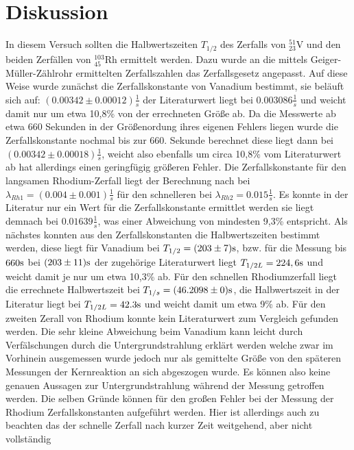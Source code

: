 \section{Diskussion}
\label{sec:diskussion}
In diesem Versuch sollten die Halbwertszeiten $T_{1/2}$ des Zerfalls von $^{51}_{23}\mathrm{V}$ und den 
beiden Zerfällen von $^{103}_{45}\mathrm{Rh}$ ermittelt werden. Dazu wurde an die mittels Geiger-Müller-Zählrohr
ermittelten Zerfallszahlen das Zerfallsgesetz angepasst. Auf diese Weise wurde zunächst die Zerfallskonstante
von Vanadium bestimmt, sie beläuft sich auf: $(0.00342\pm 0.00012)\frac{1}{s}$ der Literaturwert liegt bei $0.003086\frac{1}{s}$
und weicht damit nur um etwa 10,8\% von der errechneten Größe ab. Da die Messwerte ab etwa 660 Sekunden
in der Größenordung ihres eigenen Fehlers liegen wurde die Zerfallskonstante nochmal bis zur 660. Sekunde
berechnet diese liegt dann bei $(0.00342\pm 0.00018)\frac{1}{s}$, weicht also ebenfalls um circa 10,8\% 
vom Literaturwert ab hat allerdings einen geringfügig größeren Fehler.
Die Zerfallskonstante für den langsamen Rhodium-Zerfall
liegt der Berechnung nach bei $\lambda_{Rh1} =(0.004\pm 0.001)\frac{1}{s}$ für den schnelleren bei $\lambda_{Rh2} =0.015\frac{1}{s}$.
Es konnte in der Literatur nur ein Wert für die Zerfallskonstante ermittlet werden sie liegt demnach bei 
$0.01639\frac{1}{s}$, was einer Abweichung von mindesten 9,3\% entspricht. Als nächstes konnten aus den 
Zerfallskonstanten die Halbwertszeiten bestimmt werden, diese liegt für
Vanadium bei $T_{1/2}=(203\pm 7)\si[]{s}$, bzw. für die Messung bis $660\si[]{s}$ bei $(203\pm 11)\si[]{s}$ der zugehörige Literaturwert liegt $T_{1/2L}=224,6\si[]{s}$ und weicht
damit je nur um etwa 10,3\% ab. Für den schnellen Rhodiumzerfall liegt die errechnete Halbwertszeit bei 
$T_{1/s}=(46.2098\pm0)\si[]{s}$, die Halbwertszeit in der Literatur liegt bei $T_{1/2L}=42.3\si[]{s}$ und 
weicht damit um etwa 9\% ab. Für den zweiten Zerall von Rhodium konnte kein Literaturwert zum Vergleich gefunden werden.
Die sehr kleine Abweichung beim Vanadium
kann leicht durch Verfälschungen durch die Untergrundstrahlung erklärt werden welche zwar im Vorhinein 
ausgemessen wurde jedoch nur als gemittelte Größe von den späteren Messungen der Kernreaktion an sich abgeszogen wurde.
Es können also keine genauen Aussagen zur Untergrundstrahlung während der Messung getroffen werden.
Die selben Gründe können für den großen Fehler bei der Messung der Rhodium Zerfallskonstanten aufgeführt werden.
Hier ist allerdings auch zu beachten das der schnelle Zerfall nach kurzer Zeit weitgehend, aber nicht vollständig 
